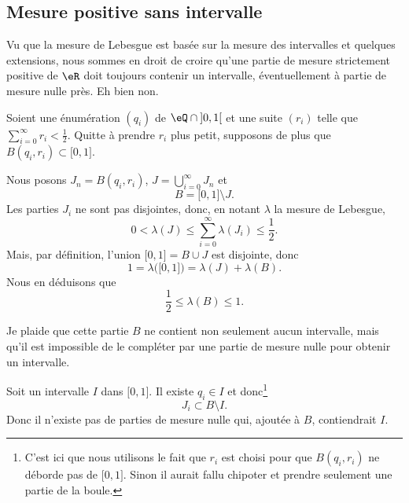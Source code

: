 \subsection{Mesure positive sans intervalle}

Vu que la mesure de Lebesgue est basée sur la mesure des intervalles et quelques extensions, nous sommes en droit de croire qu'une partie de mesure strictement positive de \( \eR\) doit toujours contenir un intervalle, éventuellement à partie de mesure nulle près. Eh bien non.

\begin{example}       \label{EXooVZVIooXZvDaE}
Soient une énumération \( (q_i)\) de \( \eQ\cap\mathopen] 0 , 1 \mathclose[\) et une suite \( (r_i)\) telle que \( \sum_{i=0}^{\infty}r_i<\frac{ 1 }{2}\). Quitte à prendre \( r_i\) plus petit, supposons de plus que \( B(q_i,r_i)\subset \mathopen[ 0 , 1 \mathclose]\).
    
    Nous posons $J_n=B(q_i,r_i)$, \( J=\bigcup_{i=0}^{\infty}J_n\) et
    \begin{equation}
        B=\mathopen[ 0 , 1 \mathclose]\setminus J.
    \end{equation}
    Les parties \( J_i\) ne sont pas disjointes, donc, en notant \( \lambda\) la mesure de Lebesgue,
    \begin{equation}
        0<\lambda(J)\leq \sum_{i=0}^{\infty}\lambda(J_i)\leq \frac{ 1 }{2}.
    \end{equation}
    Mais, par définition, l'union \( \mathopen[ 0 , 1 \mathclose]=B\cup J\) est disjointe, donc
    \begin{equation}
        1=\lambda\big( \mathopen[ 0 , 1 \mathclose] \big)=\lambda(J)+\lambda(B).
    \end{equation}
    Nous en déduisons que
    \begin{equation}
        \frac{ 1 }{2}\leq \lambda(B)\leq 1.
    \end{equation}
    
    Je plaide que cette partie \( B\) ne contient non seulement aucun intervalle, mais qu'il est impossible de le compléter par une partie de mesure nulle pour obtenir un intervalle.

    Soit un intervalle \( I\) dans \( \mathopen[ 0 , 1 \mathclose]\). Il existe \( q_i\in I\) et donc\footnote{C'est ici que nous utilisons le fait que \( r_i\) est choisi pour que \( B(q_i,r_i)\) ne déborde pas de \( \mathopen[ 0 , 1 \mathclose]\). Sinon il aurait fallu chipoter et prendre seulement une partie de la boule.}
    \begin{equation}
        J_i\subset B\setminus I.
    \end{equation}
    Donc il n'existe pas de parties de mesure nulle qui, ajoutée à \( B\), contiendrait \( I\).
\end{example}

